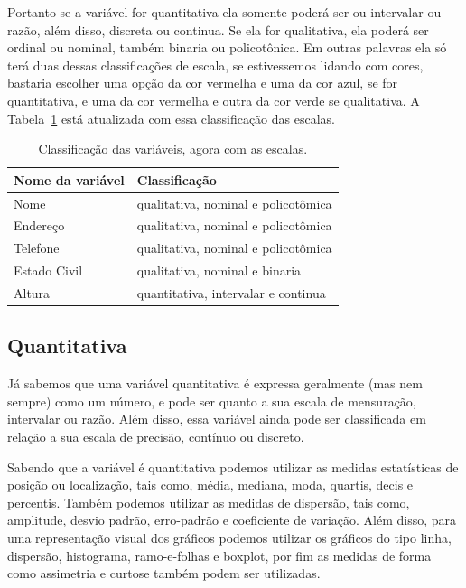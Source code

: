 \documentclass[a4paper,12pt]{book}
\begin{document}
Portanto se a variável for quantitativa ela somente poderá ser ou intervalar ou razão, além disso, discreta ou continua. Se ela for qualitativa, ela poderá ser ordinal ou nominal, também  binaria ou policotônica. Em outras palavras ela só terá duas dessas classificações de escala, se estivessemos lidando com cores, bastaria escolher uma opção da cor vermelha e uma da cor azul, se for quantitativa, e uma da cor vermelha e outra da cor verde se qualitativa. A Tabela~\ref{tbl:clienteclassificacaoescala} está atualizada com essa classificação das escalas.

\begin{table}
	\centering
	\caption{Classificação das variáveis, agora com as escalas.}
	\begin{tabular}{|l|l|}
		\hline
		\textbf{Nome da variável} &\textbf{Classificação} \\
		\hline
		Nome & qualitativa, nominal e policotômica  \\
		\hline
		Endereço & qualitativa, nominal e policotômica  \\
		\hline
		Telefone & qualitativa, nominal e policotômica \\
		\hline
		Estado Civil & qualitativa, nominal e binaria \\
		\hline
		Altura & quantitativa, intervalar e continua \\
		\hline
	\end{tabular}
	\label{tbl:clienteclassificacaoescala}
\end{table}

\subsection{Quantitativa}

Já sabemos que uma variável quantitativa é expressa geralmente (mas nem sempre) como um número, e pode ser quanto a sua escala de mensuração, intervalar ou razão. Além disso, essa variável ainda pode ser classificada em relação a sua escala de precisão, contínuo ou discreto.

Sabendo que a variável é quantitativa podemos utilizar as medidas estatísticas de posição ou localização, tais como, média, mediana, moda, quartis, decis e percentis. Também podemos utilizar as medidas de dispersão, tais como, amplitude, desvio padrão, erro-padrão e coeficiente de variação. Além disso, para uma representação visual dos gráficos podemos utilizar os gráficos do tipo linha, dispersão, histograma, ramo-e-folhas e boxplot, por fim as medidas de forma como assimetria e curtose também podem ser utilizadas\cite{favero2017manual}.
\end{document}
